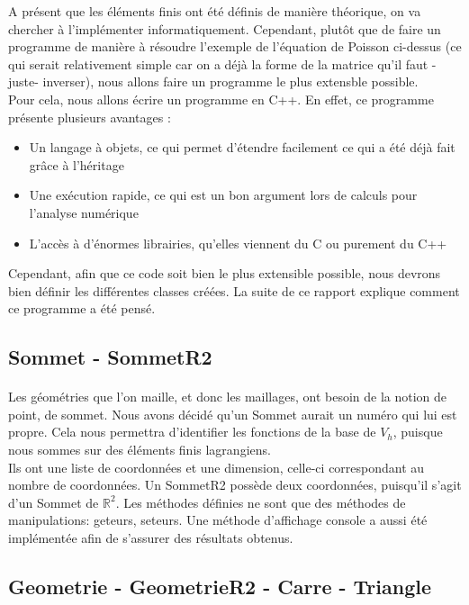 A présent que les éléments finis ont été définis de manière théorique, on va chercher à l'implémenter informatiquement. Cependant, plutôt que de faire un programme de manière à résoudre l'exemple de l'équation de Poisson ci-dessus (ce qui serait relativement simple car on a déjà la forme de la matrice qu'il faut -juste- inverser), nous allons faire un programme le plus extensble possible.\\
Pour cela, nous allons écrire un programme en C++. En effet, ce programme présente plusieurs avantages :
\begin{itemize}
	\item Un langage à objets, ce qui permet d'étendre facilement ce qui a été déjà fait grâce à l'héritage
	\item Une exécution rapide, ce qui est un bon argument lors de calculs pour l'analyse numérique
	\item L'accès à d'énormes librairies, qu'elles viennent du C ou purement du C++
\end{itemize}

Cependant, afin que ce code soit bien le plus extensible possible, nous devrons bien définir les différentes classes créées. La suite de ce rapport explique comment ce programme a été pensé.

\subsection{Sommet - SommetR2}
\paragraph{} Les géométries que l'on maille, et donc les maillages, ont besoin de la notion de point, de sommet. Nous avons décidé qu'un Sommet aurait un numéro qui lui est propre. Cela nous permettra d'identifier les fonctions de la base de $V_h$, puisque nous sommes sur des éléments finis lagrangiens. \\

Ils ont une liste de coordonnées et une dimension, celle-ci correspondant au nombre de coordonnées. Un SommetR2 possède deux coordonnées, puisqu'il s'agit d'un Sommet de $\mathbb{R}^2$. Les méthodes définies ne sont que des méthodes de manipulations: geteurs, seteurs. Une méthode d'affichage console a aussi été implémentée afin de s'assurer des résultats obtenus.\\

\subsection{Geometrie - GeometrieR2 - Carre - Triangle}
